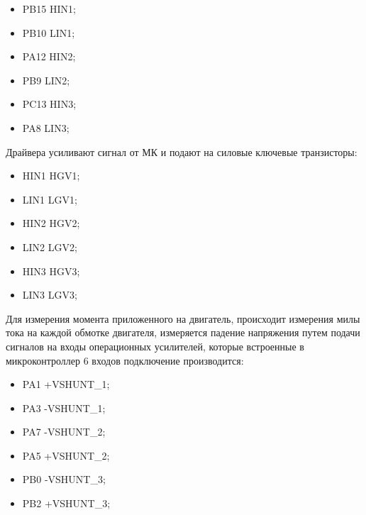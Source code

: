 \begin{itemize}
    \item PB15 \rightarrow HIN1;
    \item PB10 \rightarrow LIN1;
    \item PA12 \rightarrow HIN2;
    \item PB9 \rightarrow LIN2;
    \item PC13 \rightarrow HIN3;
    \item PA8 \rightarrow LIN3;
\end{itemize}
Драйвера усиливают сигнал от МК и подают на силовые ключевые транзисторы:
\begin{itemize}
    \item HIN1 \rightarrow HGV1;
    \item LIN1 \rightarrow LGV1;
    \item HIN2 \rightarrow HGV2;
    \item LIN2 \rightarrow LGV2;
    \item HIN3 \rightarrow HGV3;
    \item LIN3 \rightarrow LGV3;
\end{itemize}


  
Для измерения момента приложенного на двигатель, происходит измерения милы тока на каждой обмотке двигателя, измеряется падение напряжения путем подачи сигналов на входы операционных усилителей, которые встроенные в микроконтроллер 6 входов подключение производится:

\begin{itemize}
    \item PA1 \leftarrow +VSHUNT\_1;
    \item PA3 \leftarrow -VSHUNT\_1;
    \item PA7 \leftarrow -VSHUNT\_2;
    \item PA5 \leftarrow +VSHUNT\_2;  %
    \item PB0 \leftarrow -VSHUNT\_3;
    \item PB2 \leftarrow +VSHUNT\_3;  %
\end{itemize}

